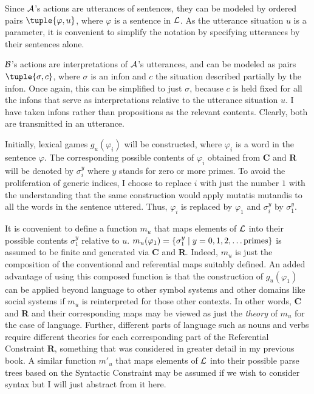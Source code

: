 Since $\cal A$'s actions are utterances of sentences, they can be modeled by ordered pairs $\tuple{\varphi,u}$, where $\varphi$ is a sentence in $\cal L$. As the utterance situation $u$ is a parameter, it is convenient to simplify the notation by specifying utterances by their sentences alone.

$\cal B$'s actions are interpretations of $\cal A$'s utterances, and can be 
modeled as pairs $\tuple{\sigma,c}$, where $\sigma$ is an infon and $c$ the situation described partially by the infon. Once again, this can be simplified to just $\sigma$, because $c$ is held fixed for all the infons that serve as interpretations relative to the utterance situation $u$. I have taken infons rather than propositions as the relevant contents. Clearly, both are transmitted in an utterance.

Initially, lexical games $g_u(\varphi_i)$ will be constructed, where $\varphi_i$ is a word in the sentence $\varphi$. The corresponding possible contents of $\varphi_i$ obtained from \textbf{C} and \textbf{R} will be denoted by $\sigma_i^{y}$ where $y$ stands for zero or more primes. To avoid the proliferation of generic indices, I choose to replace $i$ with just the number $1$ with the understanding that the same construction would apply mutatis mutandis to all the words in the sentence uttered. Thus, $\varphi_i$ is replaced by $\varphi_1$ and $\sigma_i^{y}$ by $\sigma_1^{y}$.

It is convenient to define a function $m_u$ that maps elements of $\cal L$ into their possible contents $\sigma_1^{y}$ relative to $u$. $m_u(\varphi_1) = \{ \sigma_1^{y} \mid y = 0, 1, 2, \ldots \hbox{primes} \}$ is assumed to be finite and generated via \textbf{C} and \textbf{R}. Indeed, $m_u$ is just the composition of the conventional and referential maps suitably defined. An added advantage of using this composed function is that the construction of $g_u(\varphi_1)$ can be applied beyond language to other symbol systems and other domains like social systems if $m_u$ is reinterpreted for those other contexts. In other words, \textbf{C} and \textbf{R} and their corresponding maps may be viewed as just the \emph{theory} of $m_u$ for the case of language. Further, different parts of language such as nouns and verbs require different theories for each corresponding part of the Referential Constraint \textbf{R}, something that was considered in greater detail in my previous book. A similar function $m'_u$ that maps elements of $\cal L$ into their possible parse trees based on the Syntactic Constraint may be assumed if we wish to consider syntax but I will just abstract from it here.

